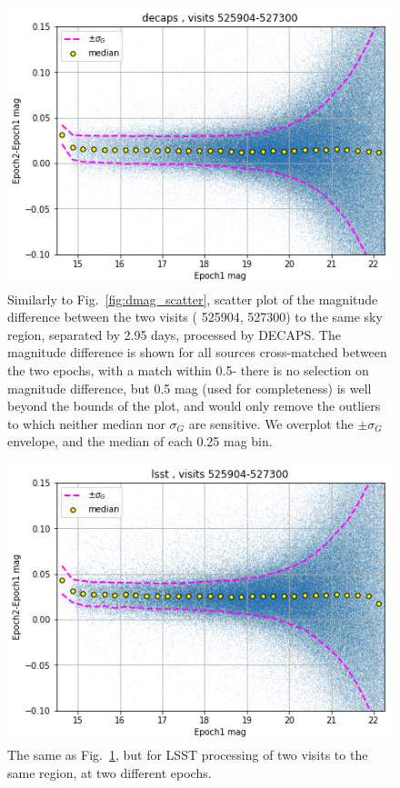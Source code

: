 \documentclass[DM,lsstdraft,toc,usenatbib]{lsstdoc}
\begin{document}
\begin{figure}
\begin{centering}
\includegraphics[width=0.7\columnwidth]{figs/18_decaps-decaps525904-527300_dmag.png}
\caption{Similarly to Fig.~\ref{fig:dmag_scatter}, scatter plot of the magnitude difference between the two  visits ( 525904, 527300) to the same sky region, separated by 2.95 days, processed by DECAPS. The magnitude difference is shown for all sources cross-matched between  the two epochs, with a match within 0.5\arcsec - there is no selection on magnitude difference, but 0.5 mag (used for completeness) is well beyond the bounds of the plot, and would only remove the outliers to which neither median nor $\sigma_{G}$ are sensitive.  We overplot the $\pm \sigma_{G}$ envelope, and the median of each 0.25 mag bin. }
\label{fig:decaps_decaps_dmag}
\end{centering}
\end{figure} 


\begin{figure}
\begin{centering}
\includegraphics[width=0.7\columnwidth]{figs/19_lsst-lsst525904-527300_dmag.png}
\caption{The same as Fig.~\ref{fig:decaps_decaps_dmag}, but for LSST processing of  two visits to the same region, at two different epochs. }
\label{fig:lsst_lsst_dmag}
\end{centering}
\end{figure} 
\end{document}
